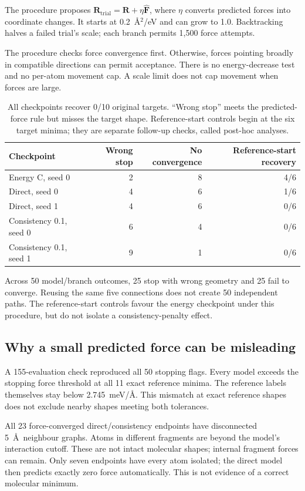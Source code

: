 \documentclass{article}
\begin{document}
The procedure proposes $\mathbf R_{\mathrm{trial}}=\mathbf R+\eta\widehat{\mathbf F}$, where $\eta$ converts predicted forces into coordinate changes. It starts at 0.2~\AA$^2$/eV and can grow to 1.0. Backtracking halves a failed trial's scale; each branch permits 1,500 force attempts.

The procedure checks force convergence first. Otherwise, forces pointing broadly in compatible directions can permit acceptance. There is no energy-decrease test and no per-atom movement cap. A scale limit does not cap movement when forces are large.
\begin{table}[H]
\centering\small
\caption{All checkpoints recover 0/10 original targets. ``Wrong stop'' meets the predicted-force rule but misses the target shape. Reference-start controls begin at the six target minima; they are separate follow-up checks, called post-hoc analyses.}\label{tab:recovery}
\begin{tabular}{lrrr}\toprule
Checkpoint & Wrong stop & No convergence & Reference-start recovery\\\midrule
Energy C, seed 0 & 2 & 8 & 4/6\\
Direct, seed 0 & 4 & 6 & 1/6\\
Direct, seed 1 & 4 & 6 & 0/6\\
Consistency 0.1, seed 0 & 6 & 4 & 0/6\\
Consistency 0.1, seed 1 & 9 & 1 & 0/6\\\bottomrule
\end{tabular}
\end{table}
Across 50 model/branch outcomes, 25 stop with wrong geometry and 25 fail to converge. Reusing the same five connections does not create 50 independent paths. The reference-start controls favour the energy checkpoint under this procedure, but do not isolate a consistency-penalty effect.
\subsection{Why a small predicted force can be misleading}
A 155-evaluation check reproduced all 50 stopping flags. Every model exceeds the stopping force threshold at all 11 exact reference minima. The reference labels themselves stay below 2.745~meV/\AA. This mismatch at exact reference shapes does not exclude nearby shapes meeting both tolerances.

All 23 force-converged direct/consistency endpoints have disconnected 5~\AA\ neighbour graphs. Atoms in different fragments are beyond the model's interaction cutoff. These are not intact molecular shapes; internal fragment forces can remain. Only seven endpoints have every atom isolated; the direct model then predicts exactly zero force automatically. This is not evidence of a correct molecular minimum.
\end{document}
